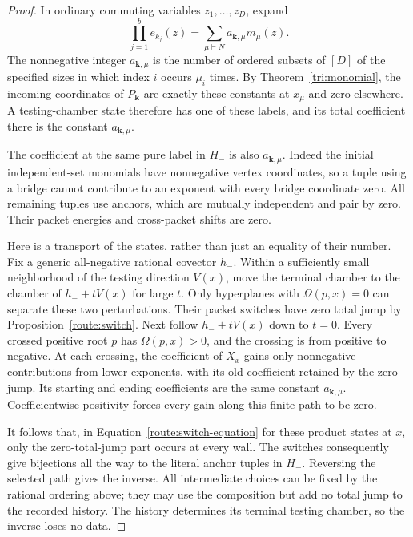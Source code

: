 \begin{proof}
In ordinary commuting variables $z_1,\ldots,z_D$, expand
\begin{equation}
 \label{route:anchor-product}
 \prod_{j=1}^b e_{k_j}(z)=\sum_{\mu\vdash N}a_{\boldsymbol k,\mu}
 m_\mu(z).
\end{equation}
The nonnegative integer $a_{\boldsymbol k,\mu}$ is the number of
ordered subsets of $[D]$ of the specified sizes in which index $i$
occurs $\mu_i$ times.  By Theorem~\ref{tri:monomial}, the incoming
coordinates of $P_{\boldsymbol k}$ are exactly these constants at
$x_\mu$ and zero elsewhere.  A testing-chamber state therefore has
one of these labels, and its total coefficient there is the
constant $a_{\boldsymbol k,\mu}$.

The coefficient at the same pure label in $H_-$ is also
$a_{\boldsymbol k,\mu}$.  Indeed the initial independent-set
monomials have nonnegative vertex coordinates, so a tuple using a
bridge cannot contribute to an exponent with every bridge
coordinate zero.  All remaining tuples use anchors, which are
mutually independent and pair by zero.  Their packet energies and
cross-packet shifts are zero.

Here is a transport of the states, rather than just an equality of
their number.  Fix a generic all-negative rational covector $h_-$.
Within a sufficiently small neighborhood of the testing direction
$V(x)$, move the terminal chamber to the chamber of
$h_-+tV(x)$ for large $t$.  Only hyperplanes with
$\Omega(p,x)=0$ can separate these two perturbations.  Their
packet switches have zero total jump by
Proposition~\ref{route:switch}.  Next follow $h_-+tV(x)$ down to
$t=0$.  Every crossed positive root $p$ has
$\Omega(p,x)>0$, and the crossing is from positive to negative.
At each crossing, the coefficient of $X_x$ gains only nonnegative
contributions from lower exponents, with its old coefficient
retained by the zero jump.  Its starting and ending coefficients
are the same constant $a_{\boldsymbol k,\mu}$.  Coefficientwise
positivity forces every gain along this finite path to be zero.

It follows that, in Equation~\eqref{route:switch-equation} for these product
states at $x$, only the zero-total-jump part occurs at every wall.
The switches consequently give bijections all the way to the
literal anchor tuples in $H_-$.  Reversing the selected path gives
the inverse.  All intermediate choices can be fixed by the rational
ordering above; they may use the composition but add no total jump
to the recorded history.  The history determines its terminal
testing chamber, so the inverse loses no data.
\end{proof}


